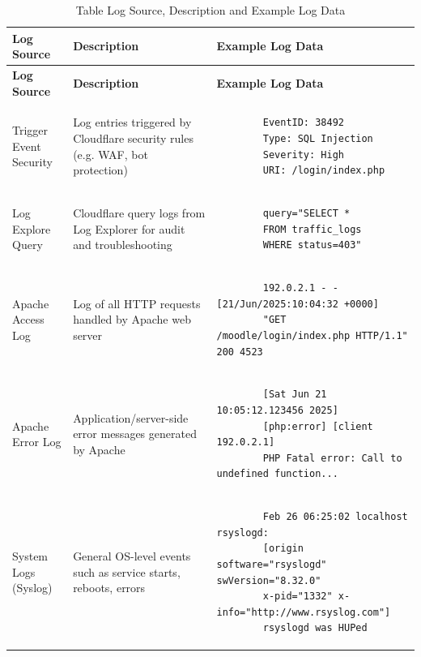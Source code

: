 \begin{longtable}{|p{3.5cm}|p{5cm}|p{7cm}|}
	\caption{Table Log Source, Description and Example Log Data}
	\label{tab:log_sources} \\
	\hline
	\textbf{Log Source} & \textbf{Description} & \textbf{Example Log Data} \\
	\hline
	\endfirsthead
	
	\hline
	\textbf{Log Source} & \textbf{Description} & \textbf{Example Log Data} \\
	\hline
	\endhead
	
	Trigger Event Security & Log entries triggered by Cloudflare security rules (e.g. WAF, bot protection) &
	\scriptsize\ttfamily
	\begin{lstlisting}
		EventID: 38492 
		Type: SQL Injection 
		Severity: High 
		URI: /login/index.php
	\end{lstlisting}
	\normalsize \\
	\hline
	
	Log Explore Query & Cloudflare query logs from Log Explorer for audit and troubleshooting &
	\scriptsize\ttfamily
	\begin{lstlisting}
		query="SELECT * 
		FROM traffic_logs 
		WHERE status=403"
	\end{lstlisting}
	\normalsize \\
	\hline
	
	Apache Access Log & Log of all HTTP requests handled by Apache web server &
	\scriptsize\ttfamily
	\begin{lstlisting}
		192.0.2.1 - - [21/Jun/2025:10:04:32 +0000] 
		"GET /moodle/login/index.php HTTP/1.1" 200 4523
	\end{lstlisting}
	\normalsize \\
	\hline
	
	Apache Error Log & Application/server-side error messages generated by Apache &
	\scriptsize\ttfamily
	\begin{lstlisting}
		[Sat Jun 21 10:05:12.123456 2025] 
		[php:error] [client 192.0.2.1] 
		PHP Fatal error: Call to undefined function...
	\end{lstlisting}
	\normalsize \\
	\hline
	
	System Logs (Syslog) & General OS-level events such as service starts, reboots, errors &
	\scriptsize\ttfamily
	\begin{lstlisting}
		Feb 26 06:25:02 localhost rsyslogd: 
		[origin software="rsyslogd" swVersion="8.32.0" 
		x-pid="1332" x-info="http://www.rsyslog.com"] 
		rsyslogd was HUPed
	\end{lstlisting}
	\normalsize \\
	\hline
	

\end{longtable}
